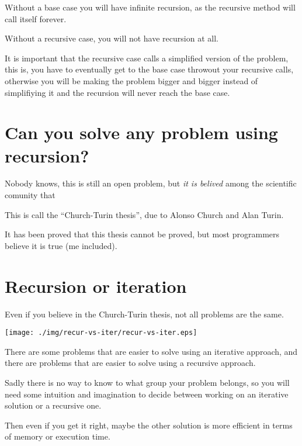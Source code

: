 \documentclass[a4paper, 9pt]{extarticle}
\begin{document}
Without a base case you will have infinite recursion, as the recursive method
will call itself forever.

Without a recursive case, you will not have recursion at all.

It is important that the recursive case calls a simplified version of the
problem, this is, you have to eventually get to the base case throwout your
recursive calls, otherwise you will be making the problem bigger and bigger
instead of simplifiying it and the recursion will never reach the base case.




\section{Can you solve any problem using recursion?}

Nobody knows, this is still an open problem, but \emph{it is belived} among the
scientific comunity that


This is call the ``Church-Turin thesis'', due to Alonso Church and Alan Turin.

It has been proved that this thesis cannot be proved, but most programmers
believe it is true (me included).






\section{Recursion or iteration}

Even if you believe in the Church-Turin thesis, not all problems are the same.

\begin{center}
  \texttt{[image: ./img/recur-vs-iter/recur-vs-iter.eps]}
\end{center}

There are some problems that are easier to solve using an iterative approach,
and there are problems that are easier to solve using a recursive approach.

Sadly there is no way to know to what group your problem belongs, so you will
need some intuition and imagination to decide between working on an iterative
solution or a recursive one.

Then even if you get it right, maybe the other solution is more efficient in
terms of memory or execution time.
\end{document}
